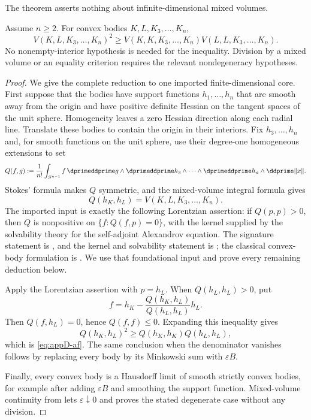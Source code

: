 The theorem asserts nothing about infinite-dimensional mixed volumes.

\begin{theorem}\label{thm:appD-af}
\leavevmode\par
Assume \(n\geq2\).  For convex bodies \(K,L,K_3,\ldots,K_n\),
\[
 V(K,L,K_3,\ldots,K_n)^2
 \geq
 V(K,K,K_3,\ldots,K_n)
 V(L,L,K_3,\ldots,K_n).
\tag{D.17}\label{eq:appD-af}
\]
No nonempty-interior hypothesis is needed for the inequality.
Division by a mixed volume or an equality criterion requires the relevant
nondegeneracy hypotheses.
\end{theorem}

\begin{proof}
We give the complete reduction to one imported finite-dimensional core.
First suppose that the bodies have support functions
\(h_1,\ldots,h_n\) that are smooth away from the origin and have positive
definite Hessian on the tangent spaces of the unit sphere.  Homogeneity
leaves a zero Hessian direction along each radial line.  Translate these
bodies to contain the origin in their interiors.  Fix
\(h_3,\ldots,h_n\) and, for smooth functions on the unit sphere,
use their degree-one homogeneous extensions to set
\[
 Q(f,g):=\frac1{n!}\int_{S^{n-1}}
       f\,\dprimeddprime g\wedge
       \dprimeddprime h_3\wedge\cdots\wedge
       \dprimeddprime h_n\wedge\ddprime\lVert x\rVert .
\]
Stokes' formula makes \(Q\) symmetric, and the mixed-volume integral
formula gives
\[
                 Q(h_K,h_L)=V(K,L,K_3,\ldots,K_n).
\]
The imported input is exactly the following Lorentzian assertion: if
\(Q(p,p)>0\), then \(Q\) is nonpositive on
\(\{f:Q(f,p)=0\}\), with the kernel supplied by the solvability theory for
the self-adjoint Alexandrov equation.  The signature statement is
\cite[Theorem~12.3]{Ber26Convex}, and the kernel and solvability statement is
\cite[Theorem~13.3]{Ber26Convex}; the classical convex-body formulation is
\cite[Theorem~7.3.1]{Sch14}.  We use that foundational input and prove every
remaining deduction below.

Apply the Lorentzian assertion with \(p=h_L\).  When \(Q(h_L,h_L)>0\), put
\[
       f=h_K-\frac{Q(h_K,h_L)}{Q(h_L,h_L)}h_L.
\]
Then \(Q(f,h_L)=0\), hence \(Q(f,f)\leq0\).  Expanding this inequality
gives
\[
                 Q(h_K,h_L)^2
                 \geq Q(h_K,h_K)Q(h_L,h_L),
\]
which is \eqref{eq:appD-af}.  The same conclusion when the denominator
vanishes follows by replacing every body by its Minkowski sum with
\(\varepsilon B\).

Finally, every convex body is a Hausdorff limit of smooth strictly convex
bodies, for example after adding \(\varepsilon B\) and smoothing the
support function.  Mixed-volume continuity from
 lets \(\varepsilon\downarrow0\) and
proves the stated degenerate case without any division.
\end{proof}

